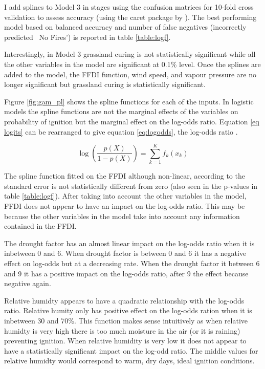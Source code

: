 \documentclass[11pt,a4paper]{article}
\begin{document}
I add splines to Model 3 in stages using the confusion matrices for 10-fold cross validation to assess accuracy (using the caret package by \cite{caret}). The best performing model based on balanced accuracy and number of false negatives (incorrectly predicted ~No Fires') is reported in table \ref{table:logf}. 

Interestingly, in Model 3 grassland curing is not statistically significant while all the other variables in the model are significant at 0.1\% level. Once the splines are added to the model, the FFDI function, wind speed, and vapour pressure are no longer significant but grassland curing is statistically significant. 

Figure \ref{fig:gam_pl} shows the spline functions for each of the inputs. In logistic models the spline functions are not the marginal effects of the variables on probability of ignition but the marginal effect on the log-odds ratio. Equation \ref{eq logits} can be rearranged to give equation \ref{eq:logodds}, the log-odds ratio \citep{james13}. 

\begin{equation}
\label{eq:logodds}
\log(\frac{p(X)}{1-p(X)}) = \sum_{k=1}^{K} f_k (x_k)
\end{equation}

The spline function fitted on the FFDI although non-linear, according to the standard error is not statistically different from zero (also seen in the p-values in table \ref{table:logf}). After taking into account the other variables in the model, FFDI does not appear to have an impact on the log-odds ratio. This may be because the other variables in the model take into account any information contained in the FFDI. 

The drought factor has an almost linear impact on the log-odds ratio when it is inbetween 0 and 6. When drought factor is between 0 and 6 it has a negative effect on log-odds but at a decreasing rate. When the drought factor it between 6 and 9 it has a positive impact on the log-odds ratio, after 9 the effect because negative again. 

Relative humidty appears to have a quadratic relationship with the log-odds ratio. Relative humity only has positive effect on the log-odds ration when it is inbetween 30 and 70\%. This function makes sense intuitively as when relative humidty is very high there is too much moisture in the air (or it is raining) preventing ignition. When relative humidity is very low it does not appear to have a statistically significant impact on the log-odd ratio. The middle values for relative humidty would correspond to warm, dry days, ideal ignition conditions. 
\end{document}
